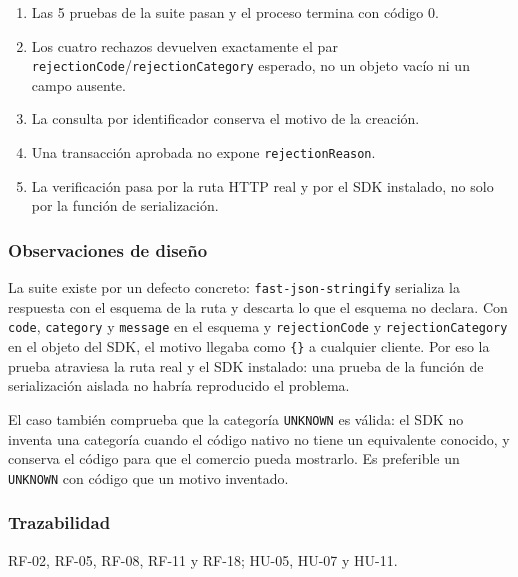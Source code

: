 \begin{enumerate}
  \item Las 5 pruebas de la suite pasan y el proceso termina con código 0.
  \item Los cuatro rechazos devuelven exactamente el par \texttt{rejectionCode}/\texttt{rejectionCategory} esperado, no un objeto vacío ni un campo ausente.
  \item La consulta por identificador conserva el motivo de la creación.
  \item Una transacción aprobada no expone \texttt{rejectionReason}.
  \item La verificación pasa por la ruta HTTP real y por el SDK instalado, no solo por la función de serialización.
\end{enumerate}

\subsubsection{Observaciones de diseño}

La suite existe por un defecto concreto: \texttt{fast-json-stringify} serializa la respuesta con el esquema de la ruta y descarta lo que el esquema no declara. Con \texttt{code}, \texttt{category} y \texttt{message} en el esquema y \texttt{rejectionCode} y \texttt{rejectionCategory} en el objeto del SDK, el motivo llegaba como \texttt{\{\}} a cualquier cliente. Por eso la prueba atraviesa la ruta real y el SDK instalado: una prueba de la función de serialización aislada no habría reproducido el problema.

El caso también comprueba que la categoría \texttt{UNKNOWN} es válida: el SDK no inventa una categoría cuando el código nativo no tiene un equivalente conocido, y conserva el código para que el comercio pueda mostrarlo. Es preferible un \texttt{UNKNOWN} con código que un motivo inventado.

\subsubsection{Trazabilidad}

RF-02, RF-05, RF-08, RF-11 y RF-18; HU-05, HU-07 y HU-11.

